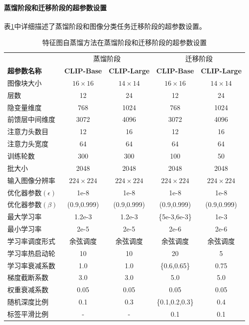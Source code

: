 \paragraph{蒸馏阶段和迁移阶段的超参数设置}
表\ref{tab:fd-hyper-pretrain}中详细描述了蒸馏阶段和图像分类任务迁移阶段的超参数设置。

\begin{table}
    \centering
    \caption{特征图自蒸馏方法在蒸馏阶段和迁移阶段的超参数设置}
    \begin{tabular}{lcccc}
    \toprule
        & \multicolumn{2}{c}{蒸馏阶段} & \multicolumn{2}{c}{迁移阶段} \\
        \bf 超参数名称 & \bf CLIP-Base & \bf CLIP-Large & \bf CLIP-Base & \bf CLIP-Large \\
        \midrule
            图像块大小 & $16 \times 16$ & $14 \times 14$ & $16 \times 16$ & $14 \times 14$ \\
            层数  & 12 & 24 & 12 & 24\\
            隐变量维度 & 768 & 1024 & 768 & 1024\\
            前馈层中间维度 & 3072 & 4096 & 3072 & 4096 \\
            注意力头数目 & 12 & 16 & 12 & 16 \\
            注意力头宽度 & 64 & 64 & 64 & 64 \\
        \midrule
            训练轮数 & 300 & 300 & 100 & 50 \\
            批大小 & 2048 & 2048 & 2048 & 2048  \\
            输入图像分辨率 & $224 \times 224$& $224 \times 224$& $224 \times 224$& $224 \times 224$\\
            优化器参数$(\epsilon)$ & 1e-8 & 1e-8 & 1e-8 & 1e-8  \\
            优化器参数$(\beta)$ & (0.9,0.999)& (0.9,0.999)& (0.9,0.999)& (0.9,0.999)  \\
            最大学习率 & 1.2e-3 & 1.2e-3 & \{5e-3,6e-3\} & 1e-3  \\
            最小学习率 & 2e-5 & 2e-5 & 2e-6 & 2e-6 \\
            学习率调度形式 & 余弦调度 & 余弦调度 & 余弦调度 & 余弦调度 \\
            学习率热启动轮 & 10 & 10 & 20 & 5 \\
            学习率衰减系数 & 1.0 & 1.0 & \{0.6,0.65\} & 0.75 \\
        \midrule
            梯度截断系数 & 3.0 & 3.0 & 5.0 & 5.0 \\
            权重衰减系数 & 0.05 & 0.05 & 0.05 & 0.05\\
            随机深度比例 & 0.1 & 0.3 & \{0.1,0.2,0.3\} & 0.4 \\
            标签平滑比例 & - & - & 0.1 & 0.1 \\
        \bottomrule
    \end{tabular}
    \label{tab:fd-hyper-pretrain}
\end{table}

